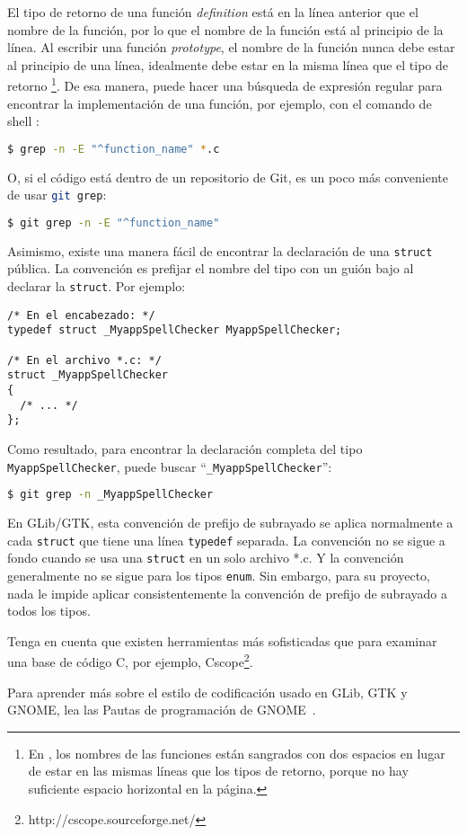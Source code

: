 El tipo de retorno de una función \emph{definition} está en la línea anterior que el nombre de la función, por lo que el nombre de la función está al principio de la línea. Al escribir una función \emph{prototype}, el nombre de la función nunca debe estar al principio de una línea, idealmente debe estar en la misma línea que el tipo de retorno \footnote{En , los nombres de las funciones están sangrados con dos espacios en lugar de estar en las mismas líneas que los tipos de retorno, porque no hay suficiente espacio horizontal en la página.}. De esa manera, puede hacer una búsqueda de expresión regular para encontrar la implementación de una función, por ejemplo, con el comando de shell :

\begin{lstlisting}[language=bash]
$ grep -n -E "^function_name" *.c
\end{lstlisting}

O, si el código está dentro de un repositorio de Git, es un poco más conveniente de usar \lstinline[language=bash]{git grep}:

\begin{lstlisting}[language=bash]
$ git grep -n -E "^function_name"
\end{lstlisting}

Asimismo, existe una manera fácil de encontrar la declaración de una \lstinline{struct} pública. La convención es prefijar el nombre del tipo con un guión bajo al declarar la \lstinline{struct}. Por ejemplo:

\begin{lstlisting}[style=GLib/GTK]
/* En el encabezado: */
typedef struct _MyappSpellChecker MyappSpellChecker;

/* En el archivo *.c: */
struct _MyappSpellChecker
{
  /* ... */
};
\end{lstlisting}

Como resultado, para encontrar la declaración completa del tipo \lstinline{MyappSpellChecker}, puede buscar ``\lstinline{_MyappSpellChecker}'':

\begin{lstlisting}[language=bash]
$ git grep -n _MyappSpellChecker
\end{lstlisting}

En GLib/GTK, esta convención de prefijo de subrayado se aplica normalmente a cada \lstinline{struct} que tiene una línea \lstinline{typedef} separada. La convención no se sigue a fondo cuando se usa una \lstinline{struct} en un solo archivo *.c. Y la convención generalmente no se sigue para los tipos \lstinline{enum}. Sin embargo, para su proyecto, nada le impide aplicar consistentemente la convención de prefijo de subrayado a todos los tipos.

Tenga en cuenta que existen herramientas más sofisticadas que  para examinar una base de código C, por ejemplo, Cscope\footnote{http://cscope.sourceforge.net/}.

Para aprender más sobre el estilo de codificación usado en GLib, GTK y GNOME, lea las Pautas de programación de GNOME~\cite{gnome-programming-guidelines}.